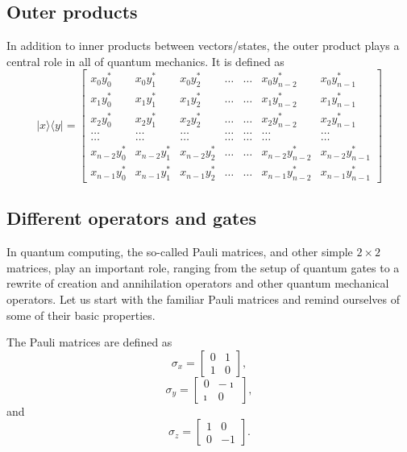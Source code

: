 \subsection{Outer products}

In addition to inner products between vectors/states, the outer
product plays a central role in all of quantum mechanics. It is
defined as
\[
\vert x\rangle \langle y \vert = \begin{bmatrix}
               x_0y_0^* & x_0y_1^* & x_0y_2^* & \dots & \dots & x_0y_{n-2}^* & x_0y_{n-1}^* \\
	       x_1y_0^* & x_1y_1^* & x_1y_2^* & \dots & \dots & x_1y_{n-2}^* & x_1y_{n-1}^* \\
	       x_2y_0^* & x_2y_1^* & x_2y_2^* & \dots & \dots & x_2y_{n-2}^* & x_2y_{n-1}^* \\	       
               \dots &   \dots   & \dots  & \dots & \dots & \dots & \dots \\
               \dots &   \dots   & \dots  & \dots & \dots & \dots & \dots \\	       
	       x_{n-2}y_0^* & x_{n-2}y_1^* & x_{n-2}y_2^* & \dots & \dots & x_{n-2}y_{n-2}^* & x_{n-2}y_{n-1}^* \\
	       x_{n-1}y_0^* & x_{n-1}y_1^* & x_{n-1}y_2^* & \dots & \dots & x_{n-1}y_{n-2}^* & x_{n-1}y_{n-1}^* \end{bmatrix}	       
\]

\subsection{Different operators and gates}

In quantum computing, the so-called Pauli matrices, and other simple
$2\times 2$ matrices, play an important role, ranging from the setup
of quantum gates to a rewrite of creation and annihilation operators
and other quantum mechanical operators. Let us start with the familiar
Pauli matrices and remind ourselves of some of their basic properties.

The Pauli matrices are defined as
\[
\sigma_x = \begin{bmatrix} 0 & 1 \\ 1 & 0 \end{bmatrix},
\]
\[
\sigma_y = \begin{bmatrix} 0 & -\imath \\ \imath & 0 \end{bmatrix},
\]
and
\[
\sigma_z = \begin{bmatrix} 1 & 0 \\ 0 & -1 \end{bmatrix}.
\]

